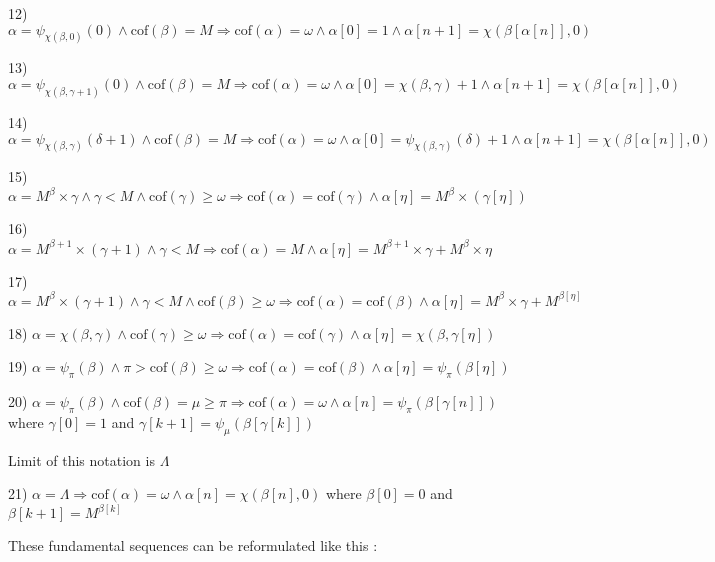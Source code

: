 \documentclass[10pt]{article}
\begin{document}
\bigskip

12) \(\alpha=\psi_{\chi(\beta,0)}(0) \wedge \text{cof}(\beta)=M\Rightarrow \text{cof}(\alpha)= \omega \wedge \alpha[0]=1 \wedge \alpha[n+1]=\chi(\beta[\alpha[n]],0)\)

13) \(\alpha=\psi_{ \chi(\beta,\gamma+1)}(0) \wedge \text{cof} (\beta)=M \Rightarrow \text{cof} (\alpha)= \omega \wedge \alpha[0]=\chi(\beta,\gamma)+1 \wedge \alpha[n+1]=\chi(\beta[\alpha[n]],0)\)

14) \(\alpha=\psi_{\chi(\beta,\gamma)}(\delta+1) \wedge \text{cof} (\beta)=M \Rightarrow \text{cof} (\alpha)= \omega \wedge \alpha[0]= \psi_{ \chi(\beta,\gamma)}(\delta)+1 \wedge \alpha[n+1]=\chi(\beta[\alpha[n]],0)\)

\bigskip

15) \(\alpha=M^{\beta}\times\gamma \wedge \gamma<M \wedge \text{cof} (\gamma)\geq\omega \Rightarrow \text{cof} (\alpha)= \text{cof}(\gamma)\wedge\alpha[\eta]=M^{\beta}\times(\gamma[\eta])\)

16) \(\alpha=M^{\beta+1}\times(\gamma+1) \wedge \gamma<M \Rightarrow \text{cof} (\alpha)=M \wedge\alpha[\eta]=M^{\beta+1}\times\gamma+M^\beta\times\eta\)

17) \(\alpha=M^\beta\times(\gamma+1) \wedge \gamma<M \wedge\text{cof}(\beta)\geq\omega \Rightarrow \text{cof}(\alpha)= \text{cof}(\beta) \wedge \alpha[\eta]=M^\beta\times\gamma+M^{\beta[\eta]}\)

\bigskip

18) \(\alpha=\chi(\beta,\gamma) \wedge \text{cof}(\gamma)\geq\omega \Rightarrow \text{cof} (\alpha)=\text{cof}(\gamma)\wedge \alpha[\eta]=\chi(\beta,\gamma[\eta])\)

19) \(\alpha=\psi_\pi(\beta) \wedge \pi>\text{cof}(\beta)\geq\omega \Rightarrow \text{cof} (\alpha)= \text{cof}(\beta) \wedge \alpha[\eta]=\psi_\pi(\beta[\eta])\)

20) \(\alpha=\psi_\pi(\beta) \wedge \text{cof}(\beta)=\mu\geq\pi \Rightarrow \text{cof} (\alpha)=\omega \wedge \alpha[n]=\psi _\pi(\beta[\gamma[n]])\) where  \(\gamma[0]=1\) and  \(\gamma[k+1]=\psi_\mu(\beta[\gamma[k]])\)

\bigskip

Limit of this notation is \(\Lambda\)

21) \(\alpha=\Lambda \Rightarrow \text{cof}(\alpha)=\omega \wedge \alpha[n]=\chi(\beta[n],0)\) where \(\beta[0]=0\) and  \(\beta[k+1]=M^{\beta[k]}\)

\bigskip

These fundamental sequences can be reformulated like this :
\end{document}
